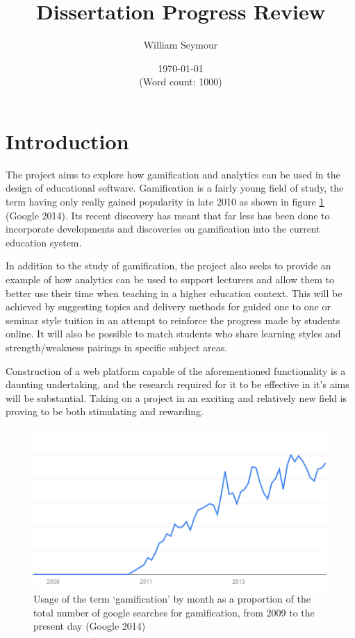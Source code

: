 \documentclass[10pt,a4paper]{report}
\author{William Seymour}
\title{Dissertation Progress Review}
\date{\today \\ (Word count: 1000)}
\begin{document}
\maketitle

\section*{Introduction}
The project aims to explore how gamification and analytics can be used in the design of educational software. Gamification is a fairly young field of study, the term having only really gained popularity in late 2010 as shown in figure \ref{usage} (Google 2014). Its recent discovery has meant that far less has been done to incorporate developments and discoveries on gamification into the current education system. 

In addition to the study of gamification, the project also seeks to provide an example of how analytics can be used to support lecturers and allow them to better use their time when teaching in a higher education context. This will be achieved by suggesting topics and delivery methods for guided one to one or seminar style tuition in an attempt to reinforce the progress made by students online. It will also be possible to match students who share learning styles and strength/weakness pairings in specific subject areas.

Construction of a web platform capable of the aforementioned functionality is a daunting undertaking, and the research required for it to be effective in it's aims will be substantial. Taking on a project in an exciting and relatively new field is proving to be both stimulating and rewarding.

\begin{figure}
	\includegraphics{../img/usage-graph.png}
	\caption{Usage of the term `gamification' by month as a proportion of the total number of google searches for gamification, from 2009 to the present day (Google 2014)}
	\label{usage}
\end{figure}
\end{document}
